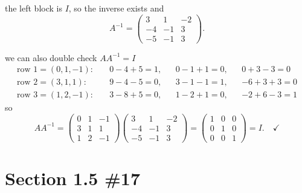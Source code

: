 \documentclass[12pt]{article}
\begin{document}
the left block is $I$, so the inverse exists and
\[
A^{-1} = \begin{pmatrix} 3 & 1 & -2 \\ -4 & -1 & 3 \\ -5 & -1 & 3 \end{pmatrix}.
\]

we can also double check $AA^{-1} = I$
\begin{align*}
\text{row } 1 = (0,1,-1): \quad & 0 - 4 + 5 = 1, & & 0 - 1 + 1 = 0, & & 0 + 3 - 3 = 0 \\
\text{row } 2 = (3,1,1): \quad & 9 - 4 - 5 = 0, & & 3 - 1 - 1 = 1, & & -6 + 3 + 3 = 0 \\
\text{row } 3 = (1,2,-1): \quad & 3 - 8 + 5 = 0, & & 1 - 2 + 1 = 0, & & -2 + 6 - 3 = 1
\end{align*}
so
\[
AA^{-1} = \begin{pmatrix} 0 & 1 & -1 \\ 3 & 1 & 1 \\ 1 & 2 & -1 \end{pmatrix}
\begin{pmatrix} 3 & 1 & -2 \\ -4 & -1 & 3 \\ -5 & -1 & 3 \end{pmatrix}
= \begin{pmatrix} 1 & 0 & 0 \\ 0 & 1 & 0 \\ 0 & 0 & 1 \end{pmatrix} = I. \quad \checkmark
\]

\section*{Section 1.5 \#17}
\end{document}
